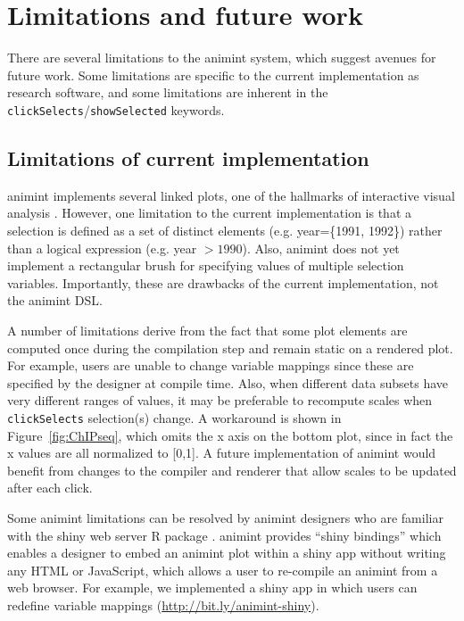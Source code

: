 \documentclass[journal]{vgtc}\usepackage[]{graphicx}\usepackage[]{color}
\begin{document}

\section{Limitations and future work}


There are several limitations to the animint system, which suggest
avenues for future work. Some limitations are specific to the current
implementation as research software, and some limitations are inherent
in the \texttt{clickSelects}/\texttt{showSelected} keywords.

\subsection{Limitations of current implementation}

animint implements several linked plots, one of the hallmarks of
interactive visual analysis \citep{iva}. However, one limitation to
the current implementation is that a selection is defined as a set of
distinct elements (e.g. year=\{1991, 1992\}) rather than a logical
expression (e.g. year $>1990$). Also, animint does not yet
implement a rectangular brush for specifying values of
multiple selection variables.
Importantly, these are drawbacks of the
current implementation, not the animint DSL.

A number of limitations derive from the fact that some plot elements
are computed once during the compilation step and remain static on a
rendered plot. For example, users are unable to change variable
mappings since these are specified by the designer at compile
time. Also, when different data subsets have very different ranges of
values, it may be preferable to recompute scales when
\texttt{clickSelects} selection(s) change. A workaround is shown in
Figure~\ref{fig:ChIPseq}, which omits the x axis on the bottom plot,
since in fact the x values are all normalized to [0,1]. A future
implementation of animint would benefit from changes to the compiler
and renderer that allow scales to be updated after each click.

Some animint limitations can be resolved by animint designers who are
familiar with the shiny web server R package \citep{shiny}.  animint
provides ``shiny bindings'' which enables a designer to embed an
animint plot within a shiny app without writing any HTML or
JavaScript, which allows a user to re-compile an animint from a web
browser. For example, we implemented a shiny app in which users can
redefine variable mappings (\url{http://bit.ly/animint-shiny}).
\end{document}
